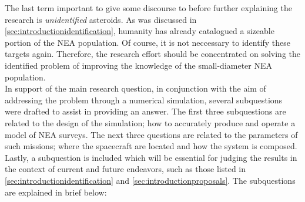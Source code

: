The last term important to give some discourse to before further explaining the research is \textit{unidentified} asteroids. As was discussed in \autoref{sec:introductionidentification}, humanity has already catalogued a sizeable portion of the NEA population. Of course, it is not neccessary to identify these targets again. Therefore, the research effort should be concentrated on solving the identified problem of improving the knowledge of the small-diameter NEA population. \\

In support of the main research question, in conjunction with the aim of addressing the problem through a numerical simulation, several subquestions were drafted to assist in providing an answer. The first three subquestions are related to the design of the simulation; how to accurately produce and operate a model of NEA surveys. The next three questions are related to the parameters of such missions; where the spacecraft are located and how the system is composed. Lastly, a subquestion is included which will be essential for judging the results in the context of current and future endeavors, such as those listed in \autoref{sec:introductionidentification} and \autoref{sec:introductionproposals}. The subquestions are explained in brief below:
